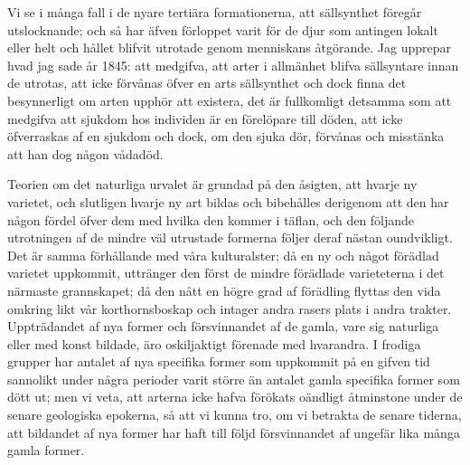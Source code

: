 Vi se i många fall i de nyare tertiära formationerna, att sällsynthet föregår utslocknande; och så har äfven förloppet varit för de djur som antingen lokalt eller helt och hållet blifvit utrotade genom menniskans åtgörande. Jag upprepar hvad jag sade år 1845: att medgifva, att arter i allmänhet blifva sällsyntare innan de utrotas, att icke förvånas öfver en arts sällsynthet och dock finna det besynnerligt om arten upphör att existera, det är fullkomligt detsamma som att medgifva att sjukdom hos individen är en förelöpare till döden, att icke öfverraskas af en sjukdom och dock, om den sjuka dör, förvånas och misstänka att han dog någon vådadöd.

Teorien om det naturliga urvalet är grundad på den åsigten, att hvarje ny varietet, och slutligen hvarje ny art bildas och bibehålles derigenom att den har någon fördel öfver dem med hvilka den kommer i täflan, och den följande utrotningen af de mindre väl utrustade formerna följer deraf nästan oundvikligt. Det är samma förhållande med våra kulturalster; då en ny och något förädlad varietet uppkommit, uttränger den först de mindre förädlade varieteterna i det närmaste grannskapet; då den nått en högre grad af förädling flyttas den vida omkring likt vår korthornsboskap och intager andra rasers plats i andra trakter. Uppträdandet af nya former och försvinnandet af de gamla, vare sig naturliga eller med konst bildade, äro oskiljaktigt förenade med hvarandra. I frodiga grupper har antalet af nya specifika former som uppkommit på en gifven tid sannolikt under några perioder varit större än antalet gamla specifika former som dött ut; men vi veta, att arterna icke hafva förökats oändligt åtminstone under de senare geologiska epokerna, så att vi kunna tro, om vi betrakta de senare tiderna, att bildandet af nya former har haft till följd försvinnandet af ungefär lika många gamla former.


